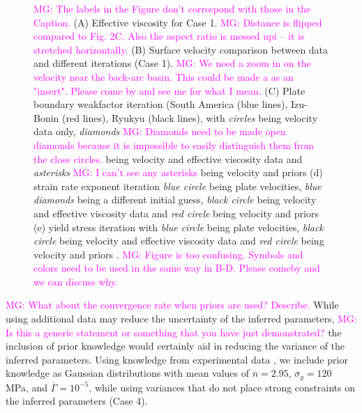 \documentclass[12pt]{article}
\newcommand{\mgnote}[1]{\textcolor{magenta}{MG: #1}}
\begin{document}
\begin{figure}[H]
\caption{\mgnote{The labels in the Figure don't correspond with those in the Caption.}
(A) Effective viscosity for Case 1. \mgnote{Distance is flipped compared to Fig. 2C. Also the aspect ratio is messed upi -- it is stretched horizontally.}
(B) Surface velocity comparison between data and different iterations (Case 1). \mgnote{We need a zoom in on the velocity near the back-arc basin. This could be made a as an "insert". Please come by and see me for what I mean.}
(C) Plate boundary weakfactor iteration (South America (blue lines), Izu-Bonin (red lines), Ryukyu (black lines), with \textit{circles} being velocity data only, \textit{diamonds} \mgnote{Diamonds need to be made open diamonds because it is impossible to easily distinguish them from the close circles.} being velocity and effective viscosity data and \textit{asterisks} \mgnote{I can't see any asterisks} being velocity and priors  (d) strain rate exponent iteration \textit{blue circle} being plate velocities, \textit{blue diamonds} being a different initial guess, \textit{black circle} being velocity and effective viscosity data and \textit{red circle} being velocity and priors (e) yield stress iteration with \textit{blue circle} being plate velocities, \textit{black circle} being velocity and effective viscosity data and \textit{red circle} being velocity and priors .
\mgnote{Figure is too confusing. Symbols and colors need to be used in the same way in B-D. Please comeby and we can discuss why.}
}
\label{fig:inverse1}
\end{figure}

\mgnote{What about the convergence rate when priors are used? Describe.}
While using additional data may reduce the uncertainty of the inferred parameters, 
\mgnote{Is this a generic statement or something that you have just demonstrated?}
the inclusion of prior knowledge would certainly aid in reducing the variance of the inferred parameters. Using knowledge from experimental data \citep{korenaga2008new}, we include prior knowledge as Gaussian distributions with mean values of $\overline{n}=2.95$, $\overline{\sigma}_y = 120$ MPa, and $\overline{\Gamma}=10^{-5}$, while using variances that do not place strong constraints on the inferred parameters (Case 4). 
\end{document}
